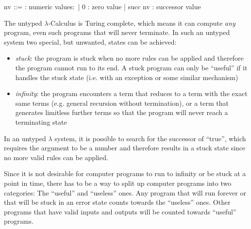 \begin{bnfgrammar}
    nv ::= : numeric values$\colon$
    | 0 : zero value
    | succ nv : successor value
\end{bnfgrammar}

The untyped $\lambda$-Calculus is Turing complete,
which means it can compute \textit{any} program, even
such programs that will never terminate.
In such an untyped system two special, but unwanted, states can be achieved:

\begin{itemize}
    \item \textit{stuck}: the program is stuck when no more
          rules can be applied and therefore the program
          cannot run to its end. A stuck program can only be
          ``useful'' if it handles the stuck state (i.e. with an exception
          or some similar mechanism)
    \item \textit{infinity}: the program encounters a term that
          reduces to a term with the exact same terms
          (e.g. general recursion without termination), or a
          term that generates limitless further terms
          so that the program will never reach a terminating
          state
\end{itemize}

In an untyped $\lambda$ system, it is possible to search
for the successor of ``true'', which
requires the argument to be a number and therefore
results in a stuck state since no more valid rules
can be applied.

Since it is not desirable for computer programs to run to infinity or be stuck at a point in time,
there has to be a way to split up computer programs into two categories:
The ``useful'' and ``useless'' ones. Any program that will run forever
or that will be stuck in an error state counts towards the ``useless'' ones.
Other programs that have valid inputs and outputs will be counted towards ``useful''
programs.

